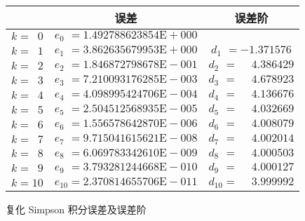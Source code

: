 \documentclass[11pt]{article}
\begin{document}
\begin{figure}[h]
    \centering
    \begin{tabular}{|l|c|c|}
        \hline
                            & 误差                                              & 误差阶                                   \\ \hline
        $k = \phantom{1} 0$ & $e_{0\phantom{1}} = 1.492788623854\text{E}{+}000$ &                                          \\ \hline
        $k = \phantom{1} 1$ & $e_{1\phantom{1}} = 3.862635679953\text{E}{+}000$ & $d_{1\phantom{1}} = -1.371576$           \\ \hline
        $k = \phantom{1} 2$ & $e_{2\phantom{1}} = 1.846872798678\text{E}{-}001$ & $d_{2\phantom{1}} = \phantom{-}4.386429$ \\ \hline
        $k = \phantom{1} 3$ & $e_{3\phantom{1}} = 7.210093176285\text{E}{-}003$ & $d_{3\phantom{1}} = \phantom{-}4.678923$ \\ \hline
        $k = \phantom{1} 4$ & $e_{4\phantom{1}} = 4.098995424706\text{E}{-}004$ & $d_{4\phantom{1}} = \phantom{-}4.136676$ \\ \hline
        $k = \phantom{1} 5$ & $e_{5\phantom{1}} = 2.504512568935\text{E}{-}005$ & $d_{5\phantom{1}} = \phantom{-}4.032669$ \\ \hline
        $k = \phantom{1} 6$ & $e_{6\phantom{1}} = 1.556578642870\text{E}{-}006$ & $d_{6\phantom{1}} = \phantom{-}4.008079$ \\ \hline
        $k = \phantom{1} 7$ & $e_{7\phantom{1}} = 9.715041615621\text{E}{-}008$ & $d_{7\phantom{1}} = \phantom{-}4.002014$ \\ \hline
        $k = \phantom{1} 8$ & $e_{8\phantom{1}} = 6.069783342610\text{E}{-}009$ & $d_{8\phantom{1}} = \phantom{-}4.000503$ \\ \hline
        $k = \phantom{1} 9$ & $e_{9\phantom{1}} = 3.793281244668\text{E}{-}010$ & $d_{9\phantom{1}} = \phantom{-}4.000127$ \\ \hline
        $k = 10$            & $e_{10} = 2.370814655706\text{E}{-}011$           & $d_{10} = \phantom{-}3.999992$           \\ \hline
    \end{tabular}
    \caption{复化 Simpson 积分误差及误差阶}
    \label{table:Simpson}
\end{figure}
\end{document}

